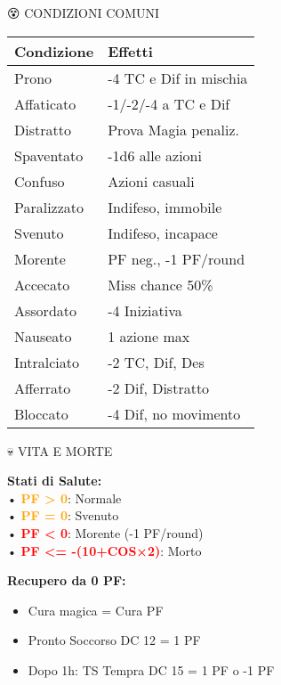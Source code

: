 \documentclass[10pt,a4paper,landscape]{article}
\newcommand{\highlight}[1]{\textcolor{orange}{\textbf{#1}}}
\newcommand{\critical}[1]{\textcolor{red}{\textbf{#1}}}
\begin{document}
\begin{multicols}{4}
		\begin{mainsection}{😵 CONDIZIONI COMUNI}
			\begin{tabular}{@{}p{2.2cm}p{3.4cm}@{}}
				\toprule
				\textbf{Condizione} & \textbf{Effetti} \\
				\midrule
				Prono & -4 TC e Dif in mischia \\
				Affaticato & -1/-2/-4 a TC e Dif \\
				Distratto & Prova Magia penaliz. \\
				Spaventato & -1d6 alle azioni \\
				Confuso & Azioni casuali \\
				Paralizzato & Indifeso, immobile \\
				Svenuto & Indifeso, incapace \\
				Morente & PF neg., -1 PF/round \\
				Accecato & Miss chance 50\% \\
				Assordato & -4 Iniziativa \\
				Nauseato & 1 azione max \\
				Intralciato & -2 TC, Dif, Des \\
				Afferrato & -2 Dif, Distratto \\
				Bloccato & -4 Dif, no movimento \\
				\bottomrule
			\end{tabular}
		\end{mainsection}

		\begin{mainsection}{💀 VITA E MORTE}
			\begin{formula}
				\textbf{Stati di Salute:}\\
				• \highlight{PF > 0}: Normale\\
				• \highlight{PF = 0}: Svenuto\\
				• \critical{PF < 0}: Morente (-1 PF/round)\\
				• \critical{PF <= -(10+COS×2)}: Morto
			\end{formula}

			\textbf{Recupero da 0 PF:}
			\begin{itemize}[noitemsep,leftmargin=8pt]
				\item Cura magica = Cura PF
				\item Pronto Soccorso DC 12 = 1 PF
				\item Dopo 1h: TS Tempra DC 15 = 1 PF o -1 PF
			\end{itemize}


\end{mainsection}
\end{multicols}
\end{document}
